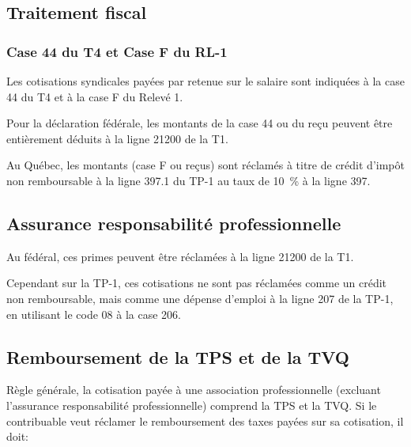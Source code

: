\subsection{Traitement fiscal}
\subsubsection{Case 44 du T4 et Case F du RL-1}
Les cotisations syndicales payées par retenue sur le salaire sont indiquées à la case 44 du T4 et à la case F du Relevé 1. 

Pour la déclaration fédérale, les montants de la case 44 ou du reçu peuvent être entièrement déduits à la ligne 21200 de la T1. 

Au Québec, les montants (case F ou reçus) sont réclamés à titre de crédit d'impôt non remboursable à la ligne 397.1 du TP-1 au taux de 10~\% à la ligne 397.

\subsection{Assurance responsabilité professionnelle}
Au fédéral, ces primes peuvent être réclamées à la ligne 21200 de la T1. 

Cependant sur la TP-1, ces cotisations ne sont pas réclamées comme un crédit non remboursable, mais comme une dépense d'emploi à la ligne 207 de la TP-1, en utilisant le code 08 à la case 206.

\subsection{Remboursement de la TPS et de la TVQ}
Règle générale, la cotisation payée à une association professionnelle (excluant l'assurance responsabilité professionnelle) comprend la TPS et la TVQ. Si le contribuable veut réclamer le remboursement des taxes payées sur sa cotisation, il doit:

